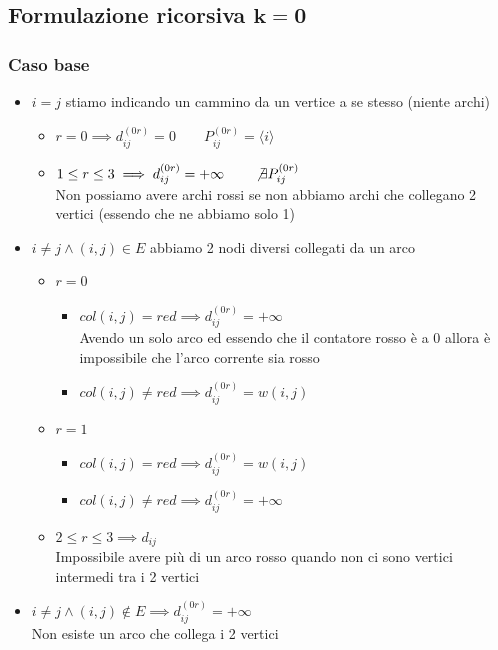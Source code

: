 \newpage
\subsection{Formulazione ricorsiva $\mathbf{k=0}$}

\subsubsection{Caso base}

\begin{itemize}
    \item $i=j$ stiamo indicando un cammino da un vertice a se stesso (niente archi)
    \begin{itemize}
        \item $r = 0 \implies d_{ij}^{(0r)} = 0  \qquad P_{ij}^{(0r)} = \langle i \rangle$
        \item $1 \leq r \leq 3 \implies d_{ij}^{(0r)} = +\infty \qquad \not \exists P_{ij}^{(0r)}$\\
        Non possiamo avere archi rossi se non abbiamo archi che collegano 2 vertici (essendo che ne abbiamo solo 1)
    \end{itemize}

    \item $i \not = j \land (i,j) \in E$ abbiamo 2 nodi diversi collegati da un arco
    \begin{itemize}
        \item $r=0$
        \begin{itemize}
            \item $col(i,j) = red \implies d_{ij}^{(0r)} = +\infty$\\ 
            Avendo un solo arco ed essendo che il contatore rosso è a 0 allora è impossibile che l'arco corrente sia rosso
            \item $col(i,j) \not = red \implies d_{ij}^{(0r)} = w(i,j)$
        \end{itemize}
        \item $r=1$
        \begin{itemize}
            \item $col(i,j) = red \implies d_{ij}^{(0r)} = w(i,j)$
            \item $col(i,j) \not = red \implies d_{ij}^{(0r)} = +\infty$
        \end{itemize}
        \item $2 \leq r \leq 3 \implies d_{ij}$ \\
        Impossibile avere più di un arco rosso quando non ci sono vertici intermedi tra i 2 vertici
    \end{itemize}
    \item $i \not = j \land (i,j) \not \in E \implies d_{ij}^{(0r)} = +\infty$\\
    Non esiste un arco che collega i 2 vertici
\end{itemize}

